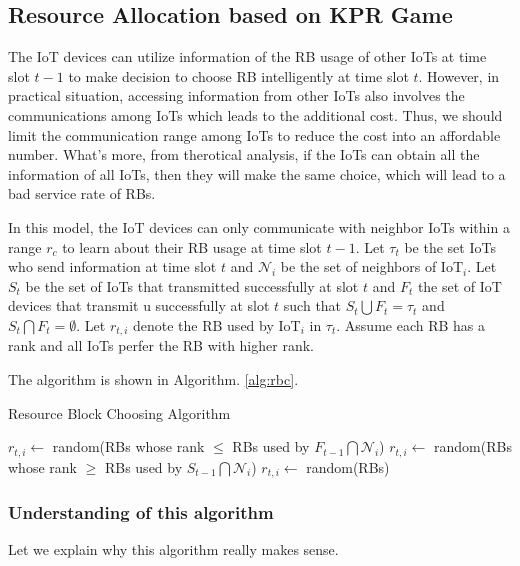 \documentclass[runningheads]{llncs}
\begin{document}
\subsection{Resource Allocation based on KPR Game}

The IoT devices can utilize information of the RB usage of other IoTs at time slot $t-1$ to
make decision to choose RB intelligently at time slot $t$. However, in practical situation, 
accessing information from other IoTs also involves the communications among IoTs which leads to the additional cost.
Thus, we should limit the communication range among IoTs to reduce the cost into an affordable number. 
What's more, from therotical analysis, if the IoTs can obtain all the information of all IoTs, then they will make the same choice,
which will lead to a bad service rate of RBs.

In this model, the IoT devices can only communicate with neighbor IoTs within a
range $r_c$ to learn about their RB usage at time slot $t-1$. Let $\tau_t$ be the set
IoTs who send information at time slot $t$ and $\mathcal{N}_i$ be the set of neighbors of IoT$_i$.
Let $S_t$ be the set of IoTs that transmitted successfully at slot $t$ and $F_t$ the set of IoT
devices that transmit u successfully at slot $t$ such that $S_t \bigcup F_t = \tau_t$ and $S_t\bigcap F_t = \emptyset$. 
Let $r_{t,i}$ denote the RB used by IoT$_i$ in $\tau_t$. Assume each RB has a rank and all IoTs perfer the RB with higher rank.

The algorithm is shown in Algorithm. \ref{alg:rbc}.

\begin{algorithm}
    \caption{Resource Block Choosing Algorithm}
    \label{alg:rbc}
    \begin{algorithmic}
        \State $r_{t,i} \gets$ random(RBs whose rank $\leq$ RBs used by $F_{t-1}\bigcap \mathcal{N}_i$)
        \State $r_{t,i} \gets$ random(RBs whose rank $\geq$ RBs used by $S_{t-1}\bigcap \mathcal{N}_i$)
    \Else
        \State $r_{t,i} \gets$ random(RBs)
    \EndIf
    \end{algorithmic}
\end{algorithm}

\subsubsection{Understanding of this algorithm}
\hfill\break
Let we explain why this algorithm really makes sense. 
\end{document}
